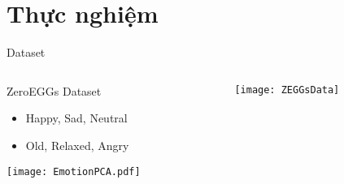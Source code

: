 
\section{Thực nghiệm}

\begin{frame}{Dataset}
	

\begin{columns}
	\begin{column}{0.5\textwidth}
		ZeroEGGs Dataset
		\begin{itemize}
			\item Happy,  Sad, Neutral
			\item Old, Relaxed, Angry
		\end{itemize}
		\texttt{[image: EmotionPCA.pdf]}
	\end{column}
	
	\begin{column}{0.5\textwidth}
		\texttt{[image: ZEGGsData]}
	\end{column}
\end{columns}
\end{frame}

%

